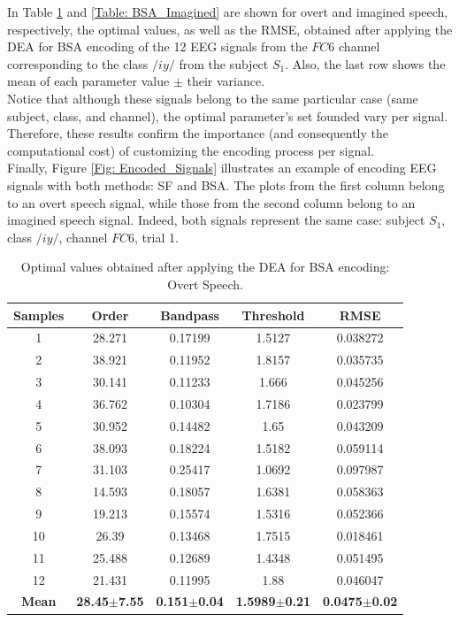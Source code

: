 In Table \ref{Table: BSA_Overt} and \ref{Table: BSA_Imagined} are shown for overt and imagined speech, respectively, the optimal values, as well as the RMSE, obtained after applying the DEA for BSA encoding of the 12 EEG signals from the $FC6$ channel corresponding to the class $/iy/$ from the subject $S_{1}$. Also, the last row shows the mean of each parameter value $\pm$ their variance.\\

Notice that although these signals belong to the same particular case (same subject, class, and channel), the optimal parameter's set founded vary per signal. Therefore, these results confirm the importance (and consequently the computational cost) of customizing the encoding process per signal.\\

Finally, Figure \ref{Fig: Encoded_Signals} illustrates an example of encoding EEG signals with both methods: SF and BSA. The plots from the first column belong to an overt speech signal, while those from the second column belong to an imagined speech signal. Indeed, both signals represent the same case: subject $S_{1}$, class $/iy/$, channel $FC6$, trial 1.\\

\begin{table}[h!]
	\centering
	\caption{Optimal values obtained after applying the DEA for BSA encoding: Overt Speech.}
	\begin{tabular}{|*{5}{c|}}
		\hline
		\textbf{Samples} & \textbf{Order} & \textbf{Bandpass} & \textbf{Threshold} & \textbf{RMSE} \\\hline
		1 & 28.271 & 0.17199 & 1.5127 & 0.038272 \\\hline
		2 & 38.921 & 0.11952 & 1.8157 & 0.035735 \\\hline
		3 & 30.141 & 0.11233 & 1.666 & 0.045256 \\\hline
		4 & 36.762 & 0.10304 & 1.7186 & 0.023799 \\\hline
		5 & 30.952 & 0.14482 & 1.65 & 0.043209 \\\hline
		6 & 38.093 & 0.18224 & 1.5182 & 0.059114 \\\hline
		7 & 31.103 & 0.25417 & 1.0692 & 0.097987 \\\hline
		8 & 14.593 & 0.18057 & 1.6381 & 0.058363 \\\hline
		9 & 19.213 & 0.15574 & 1.5316 & 0.052366 \\\hline
		10 & 26.39 & 0.13468 & 1.7515 & 0.018461 \\\hline
		11 & 25.488 & 0.12689 & 1.4348 & 0.051495 \\\hline
		12 & 21.431 & 0.11995 & 1.88 & 0.046047 \\\hline
		\textbf{Mean}  & \textbf{28.45$\pm$7.55} & \textbf{0.151$\pm$0.04} & \textbf{1.5989$\pm$0.21} & \textbf{0.0475$\pm$0.02} \\\hline
	\end{tabular}%
	\label{Table: BSA_Overt}%
\end{table}%


